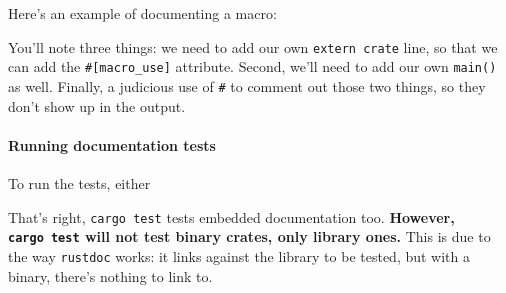 \documentclass[a4paper,]{book}
\newenvironment{Shaded}{\begin{snugshade}}{\end{snugshade}}
\newcommand{\KeywordTok}[1]{\textcolor[rgb]{0.13,0.29,0.53}{\textbf{{#1}}}}
\newcommand{\CommentTok}[1]{\textcolor[rgb]{0.56,0.35,0.01}{\textit{{#1}}}}
\newcommand{\PreprocessorTok}[1]{\textcolor[rgb]{0.56,0.35,0.01}{\textit{{#1}}}}
\newcommand{\AttributeTok}[1]{\textcolor[rgb]{0.77,0.63,0.00}{{#1}}}
\newcommand{\NormalTok}[1]{{#1}}
\let\oldparagraph\paragraph
\renewcommand{\paragraph}[1]{\oldparagraph{#1}\mbox{}}
\begin{document}
Here's an example of documenting a macro:

\begin{Shaded}
\end{Shaded}

You'll note three things: we need to add our own \texttt{extern\ crate}
line, so that we can add the \texttt{\#{[}macro\_use{]}} attribute.
Second, we'll need to add our own \texttt{main()} as well. Finally, a
judicious use of \texttt{\#} to comment out those two things, so they
don't show up in the output.

\paragraph{Running documentation
tests}\label{running-documentation-tests}

To run the tests, either

\begin{Shaded}
\end{Shaded}

That's right, \texttt{cargo\ test} tests embedded documentation too.
\textbf{However, \texttt{cargo\ test} will not test binary crates, only
library ones.} This is due to the way \texttt{rustdoc} works: it links
against the library to be tested, but with a binary, there's nothing to
link to.
\end{document}
